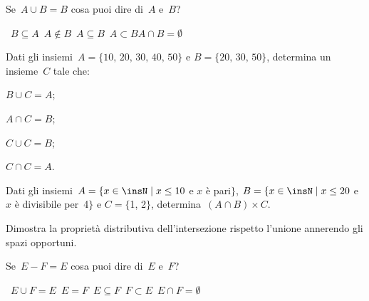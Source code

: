 \begin{esercizio}
Se~$A\cup B=B$ cosa puoi dire di~$A$ e~$B$?
\begin{center}
 \boxA\quad~$B\subseteq A$\quad\boxB\quad~$A\notin B$\quad\boxC\quad~$A\subseteq B$\quad\boxD\quad~$A\subset B$\quad\boxE\quad$A\cap B=\emptyset $
\end{center}
\end{esercizio}

\begin{esercizio}
Dati gli insiemi~$A=\{\text{10, 20, 30, 40, 50}\}$ e $B=\{\text{20, 30, 50}\}$,
determina un insieme~$C$ tale che:
\begin{multicols}{4}
\begin{enumeratea}
 \item $B\cup C=A$;
 \item $A\cap C=B$;
 \item $C\cup C=B$;
 \item $C\cap C=A$.
\end{enumeratea}
\end{multicols}
\end{esercizio}

\begin{esercizio}
Dati gli insiemi~$A=\{x\in\insN\mid x\le 10$ e $x$ è pari$\}$,
$B=\{x\in\insN\mid x\le 20$ e $x$ è divisibile per~4$\}$ e
$C=\{$1, 2$\}$, determina~$(A\cap B)\times C$.
\end{esercizio}

\begin{esercizio}
Dimostra la proprietà distributiva dell'intersezione rispetto l'unione annerendo gli spazi opportuni.
\begin{center}
 
\end{center}

\end{esercizio}

\begin{esercizio}
Se~$E-F=E$ cosa puoi dire di~$E$ e~$F$?
\begin{center}
 \boxA\quad~$E\cup F=E$\quad\boxB\quad~$E=F$\quad\boxC\quad~$E\subseteq F$\quad\boxD\quad~$F\subset E$\quad\boxE\quad~$E\cap F=\emptyset $
\end{center}
\end{esercizio}

